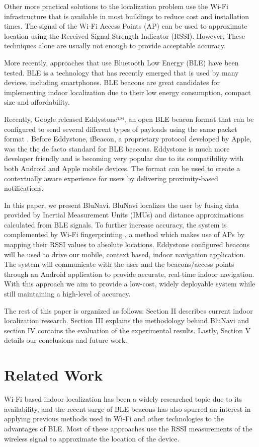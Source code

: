 \documentclass[conference]{IEEEtran}
\begin{document}
Other more practical solutions to the localization problem use the Wi-Fi infrastructure that is available in most buildings to reduce cost and installation times. The signal of the Wi-Fi Access Points (AP) can be used to approximate location using the Received Signal Strength Indicator (RSSI). However, These techniques alone are usually not enough to provide acceptable accuracy.

More recently, approaches that use Bluetooth Low Energy (BLE) have been tested. BLE is a technology that has recently emerged that is used by many devices, including smartphones. BLE beacons are great candidates for implementing indoor localization due to their low energy consumption, compact size and affordability.

Recently, Google released Eddystone™, an open BLE beacon format that can be configured to send several different types of payloads using the same packet format \cite{Eddystone}. Before Eddystone, iBeacon, a proprietary protocol developed by Apple, was the the de facto standard for BLE beacons. Eddystone is much more developer friendly and is becoming very popular due to its compatibility with both Android and Apple mobile devices. The format can be used to create a contextually aware experience for users by delivering proximity-based notifications.

In this paper, we present BluNavi. BluNavi localizes the user by fusing data provided by Inertial Measurement Units (IMUs) and distance approximations calculated from BLE signals. To further increase accuracy, the system is complemented by Wi-Fi fingerprinting , a method which makes use of APs by mapping their RSSI values to absolute locations. Eddystone configured beacons will be used to drive our mobile, context based, indoor navigation application. The system will communicate with the user and the beacons/access points through an Android application to provide accurate, real-time indoor navigation. With this approach we aim to provide a low-cost, widely deployable system while still maintaining  a high-level of accuracy.

The rest of this paper is organized as follows: Section II describes current indoor localization research. Section III explains the methodology behind BluNavi and section IV contains the evaluation of the experimental results. Lastly, Section V details our conclusions and future work.


\section{Related Work}
Wi-Fi based indoor localization has been a widely researched topic due to its availability, and the recent surge of BLE beacons has also spurred an interest in applying previous methods used in Wi-Fi and other technologies to the advantages of BLE. Most of these approaches use the RSSI measurements of the wireless signal to approximate the location of the device.
\end{document}
